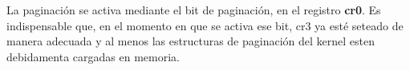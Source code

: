 	La paginación se activa mediante el bit de paginación, en el
registro \textbf{cr0}. Es indispensable que, en el momento en que se
activa ese bit, cr3 ya esté seteado de manera adecuada y al menos las
estructuras de paginación del kernel esten debidamenta cargadas en memoria.

